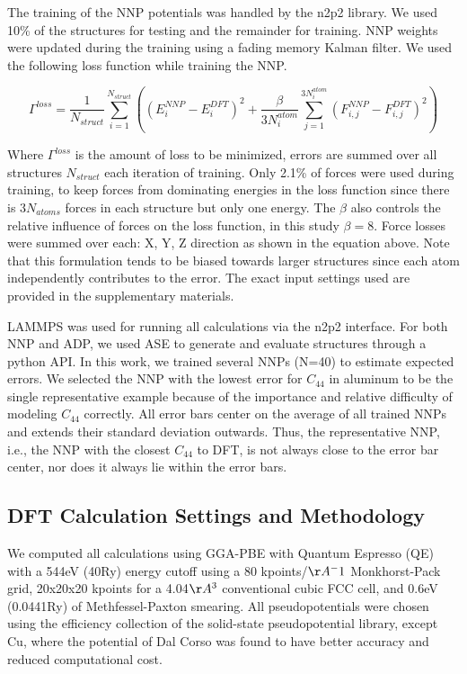 \documentclass{article}
\begin{document}
The training of the NNP potentials was handled by the n2p2 library\cite{Singraber2019ParallelPotentials}\cite{Singraber2019Library-BasedPotentials}.
We used 10\% of the structures for testing and the remainder for training.
NNP weights were updated during the training using a fading memory Kalman filter.
We used the following loss function while training the NNP.

\begin{equation}
\Gamma^{loss} = \frac{1}{N_{struct}} \sum^{N_{struct}}_{i=1}((E^{NNP}_i-E^{DFT}_i)^2+\frac{\beta}{3N^{atom}_i}\sum^{3N^{atom}_{i}}_{j=1}(F^{NNP}_{i,j}-F^{DFT}_{i,j})^2)
\end{equation}

Where $\Gamma^{loss}$ is the amount of loss to be minimized, errors are summed over all structures $N_{struct}$ each iteration of training. 
Only 2.1\% of forces were used during training, to keep forces from dominating energies in the loss function since there is $3N_{atoms}$ forces in each structure but only one energy. 
The $\beta$ also controls the relative influence of forces on the loss function, in this study $\beta = 8$.
Force losses were summed over each: X, Y, Z direction as shown in the equation above. 
Note that this formulation tends to be biased towards larger structures since each atom independently contributes to the error. 
The exact input settings used are provided in the supplementary materials.

LAMMPS\cite{Plimpton1995} was used for running all calculations via the n2p2 interface. 
For both NNP and ADP, we used ASE\cite{HjorthLarsen2017} to generate and evaluate structures through a python API. 
In this work, we trained several NNPs (N=40) to estimate expected errors.
We selected the NNP with the lowest error for $C_{44}$ in aluminum to be the single representative example because of the importance and relative difficulty of modeling $C_{44}$ correctly.
All error bars center on the average of all trained NNPs and extends their standard deviation outwards.
Thus, the representative NNP, i.e., the NNP with the closest $C_{44}$ to DFT, is not always close to the error bar center, nor does it always lie within the error bars. 


\subsection{DFT Calculation Settings and Methodology} \label{sct:dft_calcsettings_and_methods}
We computed all calculations using GGA-PBE\cite{Perdew1996} with Quantum Espresso\cite{Giannozzi2009} (QE) with a
544eV (40Ry) energy cutoff 
using a 80 kpoints/$\AA^-1$ Monkhorst-Pack grid\cite{Pack1977SpecialIntegrations},
20x20x20 kpoints for a 4.04$\AA^3$ conventional cubic FCC cell,
and 0.6eV (0.0441Ry) of Methfessel-Paxton smearing\cite{Methfessel1989High-precisionMetals}.
All pseudopotentials were chosen using the efficiency collection of the solid-state pseudopotential library\cite{Prandini2018}, except Cu, where the potential of Dal Corso\cite{DalCorso2014}
was found to have better accuracy and reduced computational cost.
\end{document}
